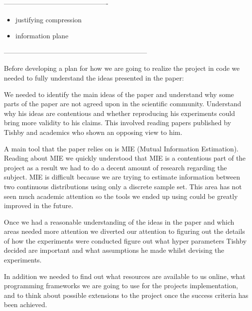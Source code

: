 ----------------------------------------------

\begin{itemize}
  \item{
      justifying compression
    }
  \item{
      information plane
    }
\end{itemize}


---------------------------------------------------------------


Before developing a plan for how we are going to realize the project in code we
needed to fully understand the ideas presented in the paper:
\begin{itemize}
    \begin{item}
      We needed to identify the main ideas of the paper and understand why some
      parts of the paper are not agreed upon in the scientific community.
      Understand why his ideas are contentious and whether reproducing his
      experiments could bring more validity to his claims. This involved reading
      papers published by Tishby and academics who shown an opposing view to
      him.
    \end{item}
    \begin{item}
      A main tool that the paper relies on is MIE (Mutual Information
      Estimation). Reading about MIE we quickly understood that MIE is a
      contentious part of the project as a result we had to do a decent amount
      of research regarding the subject. MIE is difficult because we are trying
      to estimate information between two continuous distributions using only a
      discrete sample set. This area has not seen much academic attention so the
      tools we ended up using could be greatly improved in the future.
    \end{item}
\end{itemize}

Once we had a reasonable understanding of the ideas in the paper and which areas
needed more attention we diverted our attention to figuring out the details of
how the experiments were conducted figure out what hyper parameters Tishby
decided are important and what assumptions he made whilst devising the
experiments. 

In addition we needed to find out what resources are available to us online,
what programming frameworks we are going to use for the projects implementation,
and to think about possible extensions to the project once the success criteria
has been achieved.

